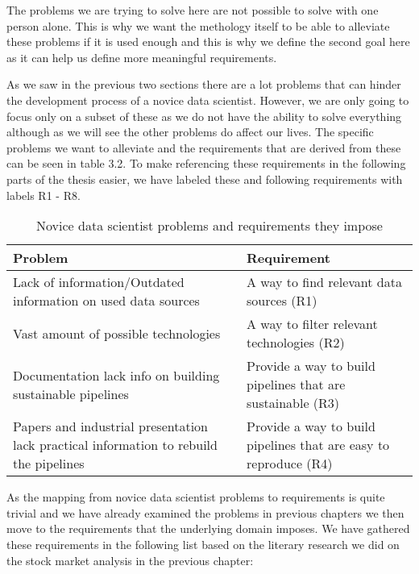 The problems we are trying to solve here are not possible to solve with one person alone.
This is why we want the methology itself to be able to alleviate these problems if it is used enough and this is why we define the second goal here as it can help us define more meaningful requirements.

As we saw in the previous two sections there are a lot problems that can hinder the development process of a novice data scientist.
However, we are only going to focus only on a subset of these as we do not have the ability to solve everything although as we will see the other problems do affect our lives.
The specific problems we want to alleviate and the requirements that are derived from these can be seen in table 3.2.
To make referencing these requirements in the following parts of the thesis easier, we have labeled these and following requirements with labels R1 - R8.

\begin{table}[! htbp]\centering 
  \caption{Novice data scientist problems and requirements they impose}
  \begin{threeparttable}
      \begin{tabular}{|p{6cm}|p{6cm}|}
      \hline
      Problem & Requirement \\ \hline
      Lack of information/Outdated information on used data sources &  A way to find relevant data sources (R1)\\ \hline
      Vast amount of possible technologies &  A way to filter relevant technologies (R2)\\ \hline
      Documentation lack info on building sustainable pipelines & Provide a way to build pipelines that are sustainable (R3) \\ \hline
      Papers and industrial presentation lack practical information to rebuild the pipelines & Provide a way to build pipelines that are easy to reproduce (R4)\\ \hline
      \end{tabular}
  \end{threeparttable}
\end{table}

As the mapping from novice data scientist problems to requirements is quite trivial and we have already examined the problems in previous chapters we then move to the requirements that the underlying domain imposes.
We have gathered these requirements in the following list based on the literary research we did on the stock market analysis in the previous chapter:


